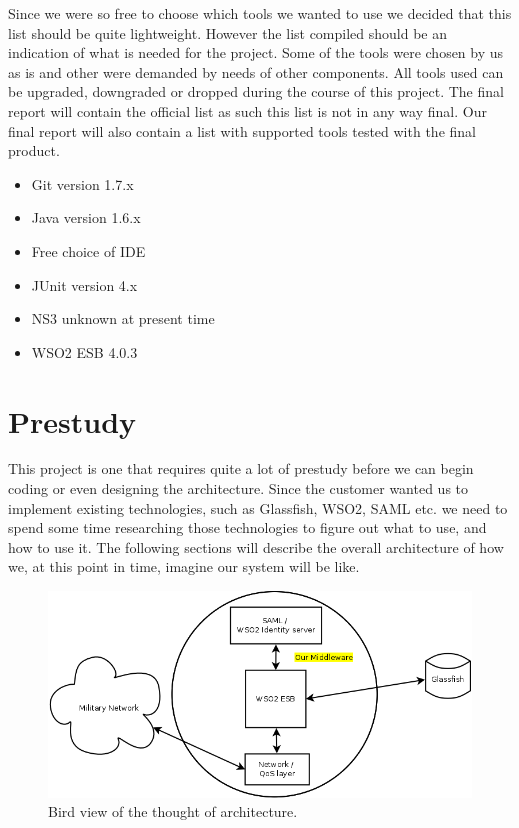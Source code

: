 \documentclass[12pt]{article}
\begin{document}
    Since we were so free to choose which tools we wanted to use we decided that this list should be quite lightweight. However the list compiled should be an indication of what is needed for the project. Some of the tools were chosen by us as is and other were demanded by needs of other components. All tools used can be  upgraded, downgraded or dropped during the course of this project. The final report will contain the official list as such this list is not in any way final. Our final report will also contain a list with supported tools tested with the final product.
    \begin{itemize}
        \item Git version 1.7.x
        \item Java version 1.6.x
        \item Free choice of IDE
        \item JUnit version 4.x
        \item NS3 unknown at present time
        \item WSO2 ESB 4.0.3
    \end{itemize}
    
\section{Prestudy}\label{prestudy} This project is one that requires quite a lot of prestudy before we can begin coding or even designing the architecture. Since the customer wanted us to implement existing technologies, such as Glassfish, WSO2, SAML etc. we need to spend some time researching those technologies to figure out what to use, and how to use it. The following sections will describe the overall architecture of how we, at this point in time, imagine our system will be like. 

        \begin{figure}[htb]
            \centering
            \includegraphics[scale=0.3]{birdarch}
            \caption{Bird view of the thought of architecture.}
            \label{fig:birdarch}
        \end{figure}
\end{document}
